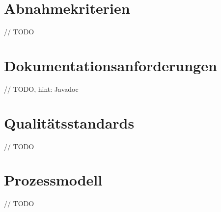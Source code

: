 \section{Abnahmekriterien}
// TODO

\section{Dokumentationsanforderungen}
// TODO, hint: Javadoc

\section{Qualitätsstandards}
// TODO

\section{Prozessmodell}
// TODO
